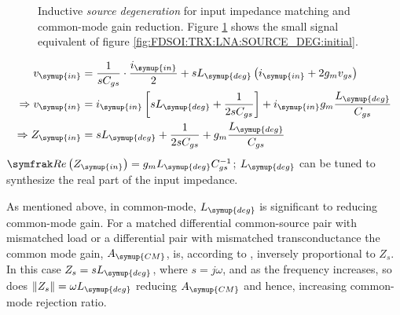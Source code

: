 \begin{figure}[h!]
\begin{subfigure}{\linewidth}
		\caption{}
		\label{fig:FDSOI:TRX:LNA:SOURCE_DEG:equiv}
	\end{subfigure}
	\caption{Inductive \textsl{source degeneration} for input impedance matching and common-mode gain reduction. Figure \ref{fig:FDSOI:TRX:LNA:SOURCE_DEG:equiv} shows the small signal equivalent of figure \ref{fig:FDSOI:TRX:LNA:SOURCE_DEG:initial}.}
	\label{fig:FDSOI:TRX:LNA:SOURCE_DEG}
	\end{figure}

	\begin{align*}
		v_{\symup{in}} &= \frac{1}{s C_{gs}}\cdot\frac{i_{\symup{in}}}{2} + s L_{\symup{deg}}\left( i_{\symup{in}} + 2g_m v_{gs} \right)\\
		\Rightarrow v_{\symup{in}} &= i_{\symup{in}}\left[ s L_{\symup{deg}} + \frac{1}{2 s C_{gs}} \right] + i_{\symup{in}} g_m\frac{L_{\symup{deg}}}{C_{gs}}\\
		\Rightarrow Z_{\symup{in}} &=  s L_{\symup{deg}} + \frac{1}{2 s C_{gs}} + g_m\frac{L_{\symup{deg}}}{C_{gs}}
	\end{align*}
	$\RE{\left( Z_{\symup{in}} \right)} = g_m L_{\symup{deg}} C_{gs}^{-1}$; $L_{\symup{deg}}$ can be tuned to synthesize the real part of the input impedance.\par

	As mentioned above, in common-mode, $L_{\symup{deg}}$ is significant to reducing common-mode gain. For a matched differential common-source pair with mismatched load or a differential pair with mismatched transconductance the common mode gain, $A_{\symup{CM}}$, is, according to \cite{SedraSmith}, inversely proportional to $Z_{s}$. In this case $Z_s=s L_{\symup{deg}}$, where $s=j\omega$, and as the frequency increases, so does $\left\| Z_s \right\|=\omega L_{\symup{deg}}$ reducing $A_{\symup{CM}}$ and hence, increasing common-mode rejection ratio.\par